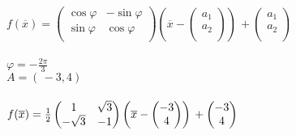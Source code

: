 \documentclass [a4paper,12pt]{article}
\begin{document}
\section{} %
%
$f({\overline{x}})= \left(
\begin{matrix}
\cos{\varphi} & -\sin{\varphi}\\
\sin{\varphi} & \cos{\varphi}\\
\end{matrix}
\right
)
\left ( {\overline{x}} -
\left(
\begin{matrix}
a_1\\
a_2\\
\end{matrix}
\right
)
\right ) \, +
\left(
\begin{matrix}
a_1\\
a_2\\
\end{matrix}
\right
)
$\\
\\
$\varphi = -\frac{2\pi}{3}$\\
$A=( \, -3, 4) \,$\\
\\
$f({\overline{x}})= \frac{1}{2}\left(
\begin{matrix}
\-1 & \sqrt{3}\\
-\sqrt{3} & -1\\
\end{matrix}
\right
)
\left ( {\overline{x}} -
\left(
\begin{matrix}
-3\\
4\\
\end{matrix}
\right
)
\right ) \, +
\left(
\begin{matrix}
-3\\
4\\
\end{matrix}
\right
)
$\\
\end{document}
